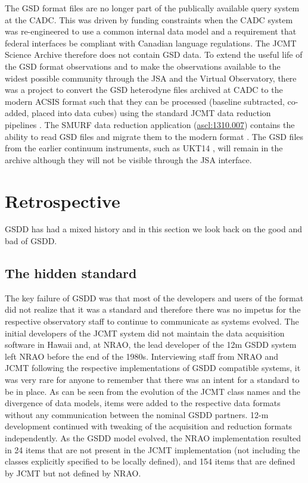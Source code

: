 \documentclass[final,authoryear,5p,times,twocolumn]{elsarticle}
\newcommand{\ascl}[1]{\href{http://www.ascl.net/#1}{ascl:#1}}
\begin{document}
The GSD format files are no longer part of the publically available
query system at the CADC. This was driven by funding constraints when
the CADC system was re-engineered to use a common internal data model
\citep{2013ASPC..475..159R} and a requirement that federal interfaces
be compliant with Canadian language regulations. The JCMT Science
Archive \citep[JSA;][]{2015Economou} therefore does not contain GSD
data.  To extend the useful life of the GSD format observations and to
make the observations available to the widest possible community
through the JSA and the Virtual Observatory, there was a project to
convert the GSD heterodyne files archived at CADC to the modern ACSIS
format \citep{OCS_ICD_022} such that they can be processed (baseline
subtracted, co-added, placed into data cubes) using the
standard JCMT data reduction pipelines
\citep{2015ACSISDR,2008ASPC..394..565J}. The SMURF data reduction
application (\ascl{1310.007}\nocite{2013ascl.soft10007J}) contains the
ability to read GSD files and migrate them to the modern format
\citep{SUN259}.  The GSD files from the earlier continuum instruments,
such as UKT14 \citep{1990MNRAS.243..126D}, will remain in the archive
although they will not be visible through the JSA interface.

\section{Retrospective}

GSDD has had a mixed history and in this section we look back on the
good and bad of GSDD.

\subsection{The hidden standard}
\label{sec:hidden}

The key failure of GSDD was that most of the
developers and users of the format did
not realize that it was a standard and therefore there was no impetus
for the respective observatory staff to continue to communicate as
systems evolved. The initial developers of the JCMT system did not
maintain the data acquisition software in Hawaii and, at
NRAO, the lead developer of the 12m GSDD system left NRAO before the
end of the 1980s.  Interviewing staff from NRAO and JCMT following
the respective implementations of GSDD compatible systems, it was very
rare for anyone to remember that there was an intent for a standard to
be in place. As can be seen from the evolution of the JCMT class names
and the divergence of data models, items were added to the respective
data formats without any communication between the nominal GSDD
partners. 12-m development continued with tweaking of the acquisition
and reduction formats independently.  As the GSDD model evolved, the
NRAO implementation resulted in 24 items that are not present in the
JCMT implementation (not including the classes explicitly specified to
be locally defined), and 154 items that are defined by JCMT but not
defined by NRAO.
\end{document}
